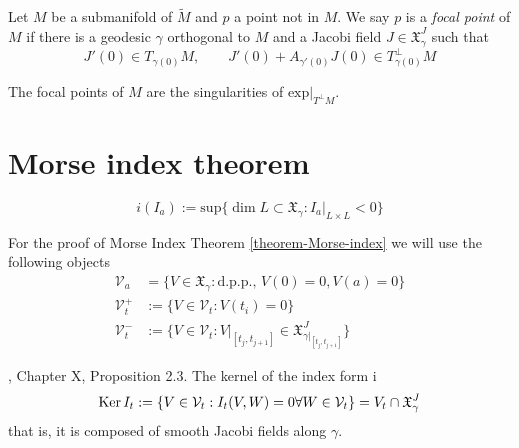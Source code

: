 \begin{definition}
\label{definition-focal-point}
Let $M$ be a submanifold of $\tilde{M}$ and
$p$ a point not in $M$. We say $p$
is a {\it focal point} of $M$ if there is a
geodesic $\gamma$ orthogonal to $M$
and a Jacobi field
$J\in\mathfrak{X}^J_\gamma$ such that
$$
J'(0)\in T_{\gamma(0)}M,\qquad
J'(0)+A_{\gamma'(0)}J(0)\in
T_{\gamma(0)}^\perp M
$$
\end{definition}

\begin{proposition}
\label{proposition-focal-point-singu-norma}
The focal points of $M$ are the singularities
of $\text{exp}|_{T^\perp M}.$
\end{proposition}

\section{Morse index theorem}
\label{section-morse-index}

\begin{definition}
\label{definition-index-index-form}
$$
i(I_a):=\text{sup}\{\dim L \subset
\mathfrak{X}_\gamma:I_a |_{L \times L}<0\}
$$
\end{definition}

For the proof of Morse Index Theorem
\ref{theorem-Morse-index} we will use the
following objects
\begin{equation}
\label{equation-index-theorem-spaces}
\begin{aligned}
\mathcal{V}_a&=\{V \in
\mathfrak{X}_\gamma:\text{d.p.p., }V(0)=0,
V(a)=0\}\\
\mathcal{V}_t^+&:=\{V \in
\mathcal{V}_t:V(t_i)=0\}\\
\mathcal{V}_t^-& :=\{V \in
\mathcal{V}_t:V|_{[t_j,t_{j+1}]}\in
\mathfrak{X}_{\gamma|_{[t_j,t_{j+1}]}}^J\}
\end{aligned}
\end{equation}

\begin{proposition}
\label{proposition-kernel-of-index-form}
\cite{doc}, Chapter X, Proposition 2.3. The
kernel of the index form i
$$
\mathop{\mathrm{Ker}} I_t:=\{V \in
\mathcal{V}_t:I_t(V,W)=0\forall
W\in\mathcal{V}_t\}=
V_t \cap \mathfrak{X}_\gamma^J
$$
that is, it is composed of smooth Jacobi
fields along $\gamma$.
\end{proposition}

